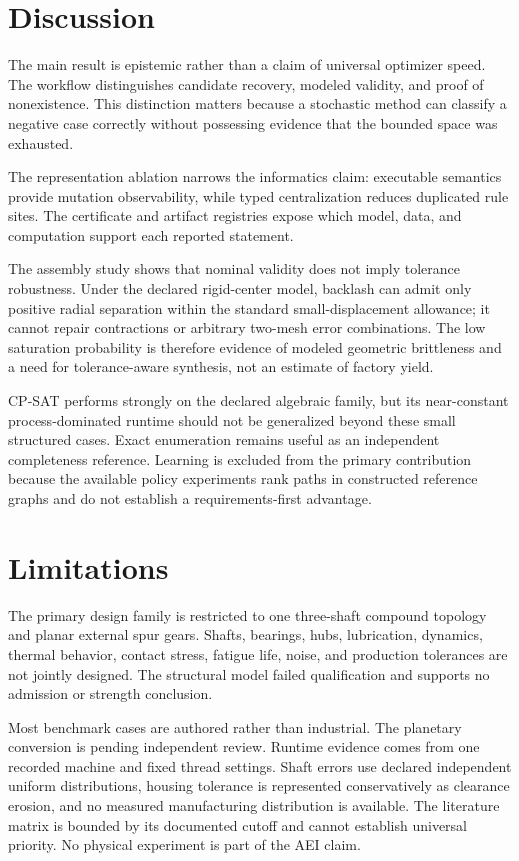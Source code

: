 \documentclass[preprint,12pt]{elsarticle}
\begin{document}
\section{Discussion}
The main result is epistemic rather than a claim of universal optimizer speed. The workflow distinguishes candidate recovery, modeled validity, and proof of nonexistence. This distinction matters because a stochastic method can classify a negative case correctly without possessing evidence that the bounded space was exhausted.

The representation ablation narrows the informatics claim: executable semantics provide mutation observability, while typed centralization reduces duplicated rule sites. The certificate and artifact registries expose which model, data, and computation support each reported statement.

The assembly study shows that nominal validity does not imply tolerance robustness. Under the declared rigid-center model, backlash can admit only positive radial separation within the standard small-displacement allowance; it cannot repair contractions or arbitrary two-mesh error combinations. The low saturation probability is therefore evidence of modeled geometric brittleness and a need for tolerance-aware synthesis, not an estimate of factory yield.

CP-SAT performs strongly on the declared algebraic family, but its near-constant process-dominated runtime should not be generalized beyond these small structured cases. Exact enumeration remains useful as an independent completeness reference. Learning is excluded from the primary contribution because the available policy experiments rank paths in constructed reference graphs and do not establish a requirements-first advantage.

\section{Limitations}
The primary design family is restricted to one three-shaft compound topology and planar external spur gears. Shafts, bearings, hubs, lubrication, dynamics, thermal behavior, contact stress, fatigue life, noise, and production tolerances are not jointly designed. The structural model failed qualification and supports no admission or strength conclusion.

Most benchmark cases are authored rather than industrial. The planetary conversion is pending independent review. Runtime evidence comes from one recorded machine and fixed thread settings. Shaft errors use declared independent uniform distributions, housing tolerance is represented conservatively as clearance erosion, and no measured manufacturing distribution is available. The literature matrix is bounded by its documented cutoff and cannot establish universal priority. No physical experiment is part of the AEI claim.
\end{document}
